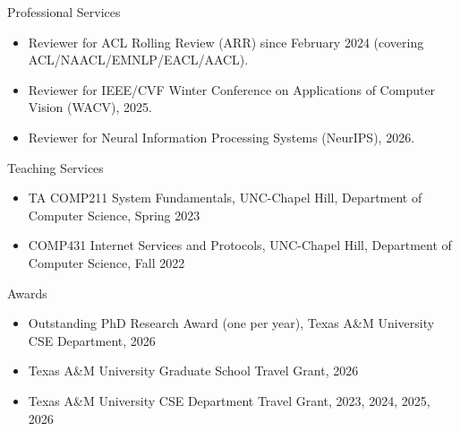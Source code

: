 \documentclass[a4paper, 12pt]{resume} %
\begin{document}
\begin{rSection}{Professional Services}
\begin{itemize}[noitemsep, topsep=0pt, leftmargin=*]
\item Reviewer for ACL Rolling Review (ARR) since February 2024 (covering ACL/NAACL/EMNLP/EACL/AACL).
\item Reviewer for IEEE/CVF Winter Conference on Applications of Computer Vision (WACV), 2025.
\item Reviewer for Neural Information Processing Systems (NeurIPS), 2026.
\end{itemize}
\end{rSection}

\begin{rSection}{Teaching Services}
\begin{itemize}[noitemsep, topsep=0pt, leftmargin=*]
\item TA COMP211 System Fundamentals, UNC-Chapel Hill, Department of Computer Science, Spring 2023
\item COMP431 Internet Services and Protocols, UNC-Chapel Hill, Department of Computer Science, Fall 2022
\end{itemize}
\end{rSection}

\begin{rSection}{Awards}
\begin{itemize}[noitemsep, leftmargin=*]
\item Outstanding PhD Research Award (one per year), Texas A\&M University CSE Department, 2026
\item Texas A\&M University Graduate School Travel Grant, 2026
\item Texas A\&M University CSE Department Travel Grant, 2023, 2024, 2025, 2026
\end{itemize}
\end{rSection}



\end{document}
